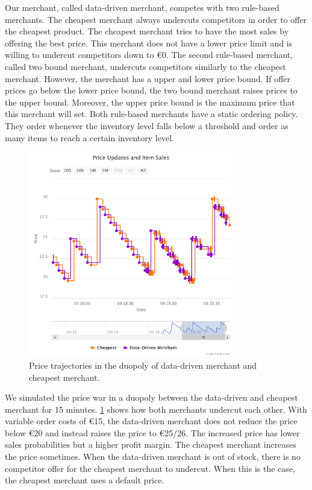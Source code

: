 Our merchant, called data-driven merchant, competes with two rule-based merchants.
The cheapest merchant always undercuts competitors in order to offer the cheapest product.
The cheapest merchant tries to have the most sales by offering the best price.
This merchant does not have a lower price limit and is willing to undercut competitors down to €0.
The second rule-based merchant, called two bound merchant, undercuts competitors similarly to the cheapest merchant.
However, the merchant has a upper and lower price bound.
If offer prices go below the lower price bound, the two bound merchant raises prices to the upper bound.
Moreover, the upper price bound is the maximum price that this merchant will set.
Both rule-based merchants have a static ordering policy.
They order whenever the inventory level falls below a threshold and order as many items to reach a certain inventory level.


\begin{figure}[t]
	\centering
	\includegraphics[width=0.8\textwidth]{figures/duopoly_cheapest_prices}
	\caption{Price trajectories in the duopoly of data-driven merchant and cheapest merchant.}
	\label{fig:duopoly_cheapest}
\end{figure}

We simulated the price war in a duopoly between the data-driven and cheapest merchant for 15 minutes.
\cref{fig:duopoly_cheapest} shows how both merchants undercut each other.
With variable order costs of €15, the data-driven merchant does not reduce the price below €20 and instead raises the price to €25/26.
The increased price has lower sales probabilities but a higher profit margin.
The cheapest merchant increases the price sometimes.
When the data-driven merchant is out of stock, there is no competitor offer for the cheapest merchant to undercut.
When this is the case, the cheapest merchant uses a default price.

